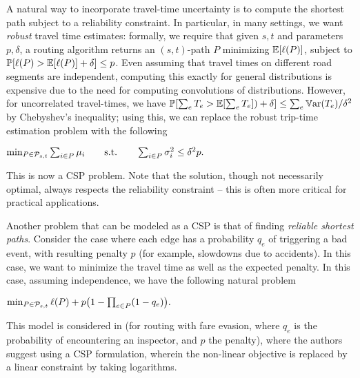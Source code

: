 A natural way to incorporate travel-time uncertainty is to compute the shortest path subject to a reliability constraint.
In particular, in many settings, we want \emph{robust} travel time estimates: formally, we require that given $s,t$ and parameters $p,\delta$, a routing algorithm returns an $(s,t)$-path $P$ minimizing $\mathbb{E}[\ell(P)]$, subject to $\mathbb{P}[\ell(P)>\mathbb{E}[\ell(P)]+\delta]\leq p$.
Even assuming that travel times on different road segments are independent, computing this exactly for general distributions is expensive due to the need for computing convolutions of distributions. However, for uncorrelated travel-times, we have $\mathbb{P}[\sum_eT_e>\mathbb{E}[\sum_eT_e])+\delta]\leq \sum_e\mathbb{V}\textnormal{ar}(T_e)/\delta^2$ by Chebyshev's inequality; using this, we can replace the robust trip-time estimation problem with the following
\begin{center}
$\min_{ P\in\mathcal{P}_{s,t}}\sum_{i\in P}\mu_i \qquad \mbox{s.t.}\qquad \sum_{i\in P}\sigma^2_i\leq \delta^2p.$
\end{center}
This is now a CSP problem. Note that the solution, though not necessarily optimal, always respects the reliability constraint -- this is often more critical for practical applications.


Another problem that can be modeled as a CSP is that of finding \emph{reliable shortest paths}.
Consider the case where each edge has a probability $q_e$ of triggering a bad event, with resulting penalty $p$ (for example, slowdowns due to accidents).
In this case, we want to minimize the travel time as well as the expected penalty.
In this case, assuming independence, we have the following natural problem
\begin{center}
$\min_{P\in\Pst} \ell(P)+p\prn*{1-\prod_{e\in P}(1-q_e)}.$
\end{center}
This model is considered in \cite{fareevasion} (for routing with fare evasion, where $q_e$ is the probability of encountering an inspector, and $p$ the penalty), where the authors suggest using a CSP formulation, wherein the non-linear objective is replaced by a linear constraint by taking logarithms.


